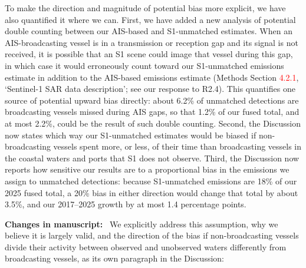 \documentclass[11pt]{article}
\newcommand{\changes}{\par\medskip\noindent%
  \textbf{\textcolor{changegreen}{Changes in manuscript:}}\ }
\begin{document}
To make the direction and magnitude of potential bias more explicit, we have also quantified it where we can. First, we have added a new analysis of potential double counting between our AIS-based and S1-unmatched estimates. When an AIS-broadcasting vessel is in a transmission or reception gap and its signal is not received, it is possible that an S1 scene could image that vessel during this gap, in which case it would erroneously count toward our S1-unmatched emissions estimate in addition to the AIS-based emissions estimate (Methods Section \textcolor{red}{4.2.1}, `Sentinel-1 SAR data description'; see our response to R2.4). This quantifies one source of potential upward bias directly: about 6.2\% of unmatched detections are broadcasting vessels missed during AIS gaps, so that 1.2\% of our fused total, and at most 2.2\%, could be the result of such double counting. Second, the Discussion now states which way our S1-unmatched estimates would be biased if non-broadcasting vessels spent more, or less, of their time than broadcasting vessels in the coastal waters and ports that S1 does not observe. Third, the Discussion now reports how sensitive our results are to a proportional bias in the emissions we assign to unmatched detections: because S1-unmatched emissions are 18\% of our 2025 fused total, a 20\% bias in either direction would change that total by about 3.5\%, and our 2017--2025 growth by at most 1.4 percentage points.

\changes 
We explicitly address this assumption, why we believe it is largely valid, and the direction of the bias if non-broadcasting vessels divide their activity between observed and unobserved waters differently from broadcasting vessels, as its own paragraph in the Discussion:
\end{document}
